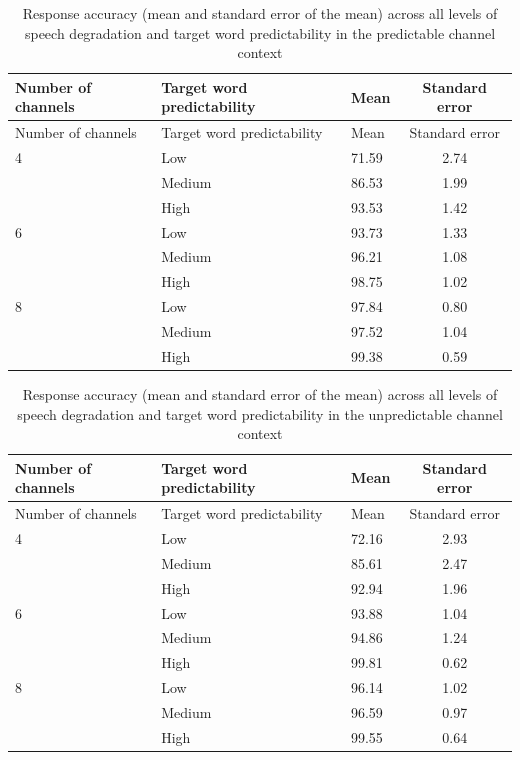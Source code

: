 \documentclass[a4paper, nobind]{templates/ociamthesis}
\begin{document}
\begin{longtable}[]{@{}lllc@{}}
\caption{Response accuracy (mean and standard error of the mean) across all levels of speech degradation and target word predictability in the predictable channel context}
\label{summarypredictable}
\tabularnewline
\toprule
Number of channels & Target word predictability & Mean & Standard
error \\
\midrule
\endfirsthead
\toprule
Number of channels & Target word predictability & Mean & Standard
error \\
\midrule
\endhead
4 & Low & 71.59 & 2.74 \\
& Medium & 86.53 & 1.99 \\
& High & 93.53 & 1.42 \\
6 & Low & 93.73 & 1.33 \\
& Medium & 96.21 & 1.08 \\
& High & 98.75 & 1.02 \\
8 & Low & 97.84 & 0.80 \\
& Medium & 97.52 & 1.04 \\
& High & 99.38 & 0.59 \\
\bottomrule
\end{longtable}

\begin{longtable}[]{@{}lllc@{}}
\caption{Response accuracy (mean and standard error of the mean) across all levels of speech degradation and target word predictability in the unpredictable channel context}
\label{summaryunpredictable}
\tabularnewline
\toprule
Number of channels & Target word predictability & Mean & Standard
error \\
\midrule
\endfirsthead
\toprule
Number of channels & Target word predictability & Mean & Standard
error \\
\midrule
\endhead
4 & Low & 72.16 & 2.93 \\
& Medium & 85.61 & 2.47 \\
& High & 92.94 & 1.96 \\
6 & Low & 93.88 & 1.04 \\
& Medium & 94.86 & 1.24 \\
& High & 99.81 & 0.62 \\
8 & Low & 96.14 & 1.02 \\
& Medium & 96.59 & 0.97 \\
& High & 99.55 & 0.64 \\
\bottomrule
\end{longtable}
\end{document}
